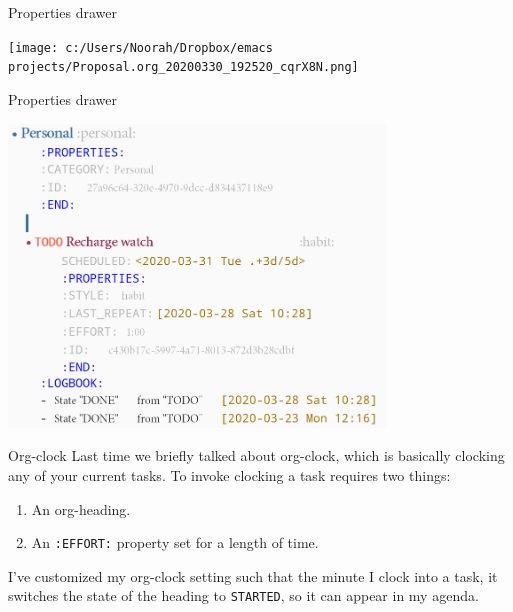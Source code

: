 \documentclass[presentation]{beamer}
\begin{document}
\begin{frame}[label={sec:org3820805}]{Properties drawer}
\begin{center}
\texttt{[image: c:/Users/Noorah/Dropbox/emacs projects/Proposal.org\_20200330\_192520\_cqrX8N.png]}
\end{center}
\end{frame}

\begin{frame}[label={sec:org90d6136}]{Properties drawer}
\begin{center}
\includegraphics[width=0.75\textwidth]{3.png}
\end{center}
\end{frame}

\begin{frame}[label={sec:org045d056},fragile]{Org-clock}
 Last time we briefly talked about org-clock, which is basically clocking any of your current tasks. To invoke clocking a task requires two things:

\begin{enumerate}
\item An org-heading.
\item An \texttt{:EFFORT:} property set for a length of time.
\end{enumerate}

I've customized my org-clock setting such that the minute I clock into a task, it switches the state of the heading to \texttt{STARTED}, so it can appear in my agenda.
\end{frame}
\end{document}
